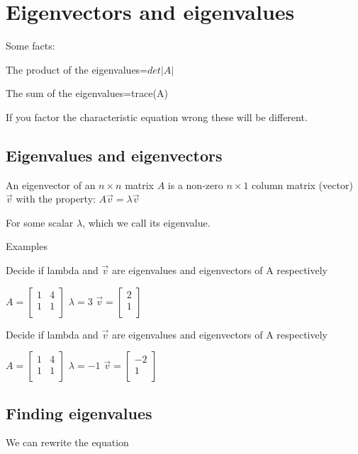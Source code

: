 \documentclass{extarticle}
\begin{document}
\section{Eigenvectors and eigenvalues}
Some facts:

	The product of the eigenvalues=$det|A|$
	
	The sum of the eigenvalues=trace(A)
	
If you factor the characteristic equation wrong these will be different.


\subsection{Eigenvalues and eigenvectors}

An eigenvector of an $n\times n$ matrix $A$ is a non-zero $n\times 1$ column matrix (vector) $\vec{v}$ with the property:
$A\vec{v}=\lambda\vec{v}$

For some scalar $\lambda$, which we call its eigenvalue.

Examples

Decide if lambda and $\vec{v}$ are eigenvalues and eigenvectors of A respectively

$A=\left[\begin{matrix}1&4\\1&1\\\end{matrix}\right]$	$\lambda=3$	$\vec{v}=\left[\begin{matrix}2\\1\\\end{matrix}\right]$

Decide if lambda and $\vec{v}$ are eigenvalues and eigenvectors of A respectively

$A=\left[\begin{matrix}1&4\\1&1\\\end{matrix}\right]$	$\lambda=-1$	$\vec{v}=\left[\begin{matrix}-2\\1\\\end{matrix}\right]$



\subsection{Finding eigenvalues}
We can rewrite the equation
\end{document}
